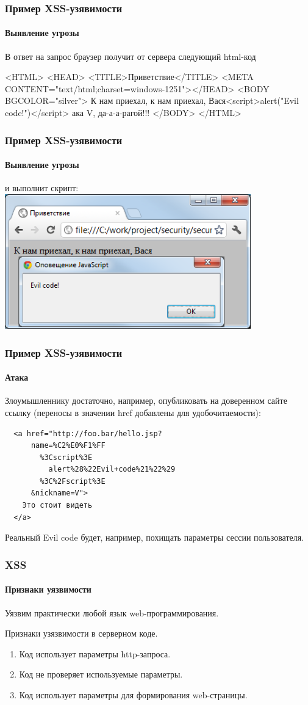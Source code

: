 \begin{frame}[fragile]
    \frametitle{Пример XSS-узявимости}
    \framesubtitle{Выявление угрозы}
    
    В ответ на запрос браузер получит от сервера следующий html-код
\begin{semiverbatim}
<HTML>
  <HEAD> <TITLE>Приветствие</TITLE>
    <META CONTENT="text/html;charset=windows-1251"></HEAD>
  <BODY BGCOLOR="silver">
    К нам приехал, к нам приехал, 
    Вася<script>alert("Evil code!")</script>
    ака V,
    да-а-а-рагой!!!
  </BODY>
</HTML>
\end{semiverbatim}
\end{frame}

\begin{frame}[fragile]
    \frametitle{Пример XSS-узявимости}
    \framesubtitle{Выявление угрозы}

    и выполнит скрипт:
    \includegraphics[width=0.8\textwidth]{fig/htmlxsshack.png}
\end{frame}

\begin{frame}[fragile]
    \frametitle{Пример XSS-узявимости}
    \framesubtitle{Атака}

    Злоумышленнику достаточно, например, опубликовать на доверенном сайте ссылку (переносы в значении href добавлены для удобочитаемости):
\begin{verbatim}
  <a href="http://foo.bar/hello.jsp?
      name=%C2%E0%F1%FF
        %3Cscript%3E
          alert%28%22Evil+code%21%22%29
        %3C%2Fscript%3E
      &nickname=V">
    Это стоит видеть
  </a>
\end{verbatim}
    Реальный Evil code будет, например, похищать параметры сессии пользователя.
\end{frame}


\begin{frame}
    \frametitle{XSS}
    \framesubtitle{Признаки уязвимости}
    
    Уязвим практически любой язык web-программирования.
    
    Признаки узязвимости в серверном коде.
    \begin{enumerate}
        \item Код использует параметры http-запроса.
        \item Код не проверяет используемые параметры.
        \item Код использует параметры для формирования web-страницы.
    \end{enumerate}
\end{frame}

